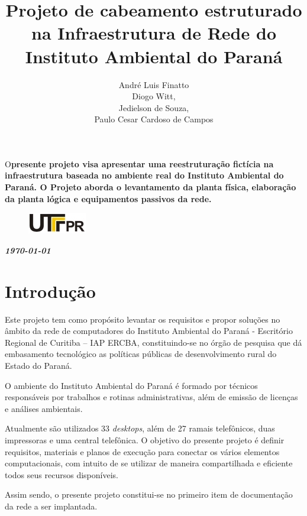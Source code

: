 \documentclass[	DIV=calc,%
							paper=a4,%
							fontsize=12pt,%
							onecolumn]{scrartcl}	 					%
\title{Projeto de cabeamento estruturado na Infraestrutura de Rede do Instituto Ambiental do Paraná}					%
\author{André Luis Finatto
	\\ Diogo Witt,
	\\ Jedielson de Souza,
	\\ Paulo Cesar Cardoso de Campos \vspace{1cm}}  	%
\date{}																				%
\newcommand{\initial}[1]{%
     \lettrine[lines=3,lhang=0.3,nindent=0em]{
     				\color{DarkGoldenrod}
     				{\textsf{#1}}}{}}
\begin{document}
\maketitle
\thispagestyle{fancy} 	
\thispagestyle{empty}		%
\initial{O}\textbf{presente projeto visa apresentar uma reestruturação fictícia na infraestrutura baseada no ambiente real do Instituto Ambiental do Paraná. O Projeto aborda o levantamento da planta física, elaboração da planta lógica e equipamentos passivos da rede.}

\begin{figure}
	\centering
	\includegraphics{utfpr}
\end{figure}

\vspace{1,5cm}
\centerline{\textit{\textbf{\today}}}

\clearpage
\renewcommand*\listfigurename{Lista de figuras}
\listoffigures
\renewcommand*\listtablename{Lista de tabelas}
\listoftables

\clearpage
\renewcommand{\contentsname}{Sumário}
\tableofcontents
\clearpage
\section{Introdução}
\onehalfspacing %
Este projeto tem como propósito levantar os requisitos e propor soluções no âmbito da rede de computadores do Instituto Ambiental do Paraná - Escritório Regional de Curitiba – IAP ERCBA, constituindo-se no órgão de pesquisa que dá embasamento tecnológico as políticas públicas de desenvolvimento rural do Estado do Paraná.\par
O ambiente do Instituto Ambiental do Paraná é formado por técnicos responsáveis por trabalhos e rotinas administrativas, além de emissão de licenças e análises ambientais.\par
Atualmente são utilizados 33 \textit{desktops}, além de 27 ramais telefônicos, duas impressoras e uma central telefônica.
O objetivo do presente projeto é definir requisitos, materiais e planos de execução para conectar os vários elementos computacionais, com intuito de se utilizar de maneira compartilhada e eficiente todos seus recursos disponíveis. \par
Assim sendo, o presente projeto constitui-se no primeiro item de documentação da rede a ser implantada.
\end{document}
